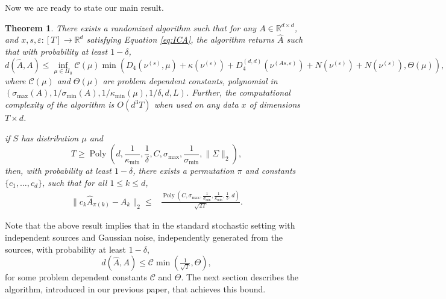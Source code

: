 \documentclass{article} %
\newcommand{\real}{\mathbb{R}}
\DeclareMathOperator{\pol}{Poly}
\newcommand{\poly}[1]{\pol\left(#1\right)}
\newcommand{\eps}{\epsilon}
\renewcommand{\epsilon}{\varepsilon}
\newtheorem{thm}[lemma]{Theorem}
\theoremstyle{definition}
\begin{document}
Now we are ready to state our main result. 
\begin{thm}
\label{thm:finalRes} 
There exists a randomized algorithm such that 
for any $A\in \real^{d\times d}$, and $x, s, \epsilon: [T] \rightarrow \real^d$ satisfying Equation \eqref{eq:ICA},
the algorithm returns $\hat{A}$
such that with probability at least $1-\delta$,
\[
d(\hat{A}, A) \le
\inf_{\mu\in \Pi_0} \mathcal{C}(\mu) \min\left(D_4(\nu^{(s)},\mu)+ \kappa(\nu^{(\eps)}) + D_4^{(d,d)}(\nu^{(As,\eps)})
+N(\nu^{(\eps)}) + N( \nu^{(s)}), \Theta(\mu) \right),
\]
where $\mathcal{C}(\mu)$ and $\Theta(\mu)$ are problem dependent constants, polynomial in $(\sigma_{\max}(A), 1/\sigma_{\min}(A), 1/\kappa_{\min}(\mu),1/\delta, d, L)$.
Further, the computational complexity of the algorithm is $O(d^3 T)$ when used on any data $x$ of dimensions $T\times d$.

if $S$ has distribution $\mu$ and
\[
T \ge \poly{d, \frac{1}{\kappa_{\min}}, \frac{1}{\delta}, C, \sigma_{\max}, \frac{1}{\sigma_{\min}}, \|\Sigma\|_2},
\]
then, with probability at least $1-\delta$, there exists a permutation $\pi$ and constants $\{c_1,\ldots,c_d\}$, such that for all $1\le k\le d$,
\begin{align*}
 \| c_k\hat{A}_{\pi(k)} - A_k\|_2 \le 
& \frac{\poly{C, \sigma_{\max}, \frac{1}{\sigma_{\min}}, \frac{1}{\kappa_{\min}},\frac{1}{\delta}, d}}{\sqrt{2T}}.
\end{align*}
\fi
\end{thm}
Note that the above result implies that in the standard stochastic setting
with independent sources and Gaussian noise, independently generated from the sources, 
with probability at least $1-\delta$,
\[
d(\hat{A}, A) \le \mathcal{C} \min\left(\tfrac{1}{\sqrt{T}}, \Theta \right),
\]
for some problem dependent constants $\mathcal{C}$ and $\Theta$.
The next section describes the algorithm, introduced in our previous paper, that achieves this bound.
\end{document}
